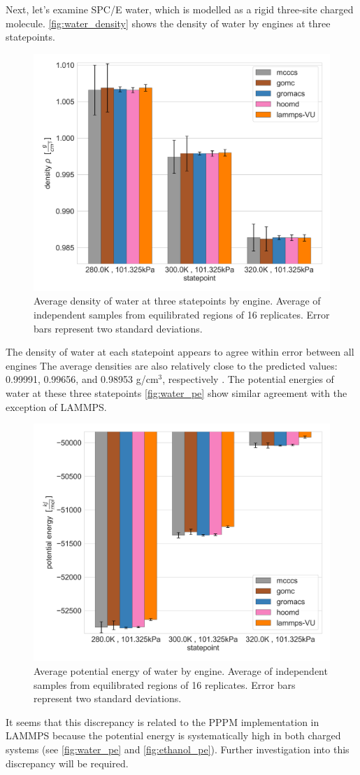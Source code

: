 Next, let's examine SPC/E water, which is modelled as a rigid three-site charged molecule. 
\autoref{fig:water_density} shows the density of water by engines at three statepoints.
\begin{figure}[h!]
    \centering
    \includegraphics[width=0.8\linewidth,keepaspectratio]{figures/rep_study/waterSPCE_summary.png}
    \caption{Average density of water at three statepoints by engine. Average of independent samples from equilibrated regions of 16 replicates. Error bars represent two standard deviations.}\label{fig:water_density}
\end{figure}
The density of water at each statepoint appears to agree within error between all engines
The average densities are also relatively close to the predicted values: 0.99991, 0.99656, and 0.98953 g/cm$^3$, respectively \cite{NISTwebbook}.
The potential energies of water at these three statepoints \autoref{fig:water_pe} show similar agreement with the exception of LAMMPS.
\begin{figure}[h!]
    \centering
    \includegraphics[width=0.8\linewidth,keepaspectratio]{figures/rep_study/waterSPCE_pe_summary.png}
    \caption{Average potential energy of water by engine. Average of independent samples from equilibrated regions of 16 replicates. Error bars represent two standard deviations.}\label{fig:water_pe}
\end{figure}
It seems that this discrepancy is related to the PPPM implementation in LAMMPS because the potential energy is systematically high in both charged systems (see \autoref{fig:water_pe} and \autoref{fig:ethanol_pe}).
Further investigation into this discrepancy will be required.

